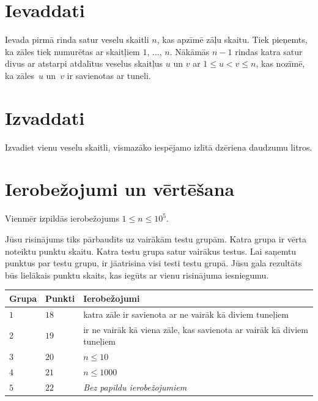 \section*{Ievaddati}

Ievada pirmā rinda satur veselu skaitli $n$, kas apzīmē zāļu skaitu.
Tiek pieņemts, ka zāles tiek numurētas ar skaitļiem $1$, $\ldots$, $n$.
Nākāmās $n-1$ rindas katra satur divus ar atstarpi atdalītus veselus skaitļus $u$ un $v$ ar 
$1\leq u < v \leq n$, %
kas nozīmē, ka zāles~$u$ un~$v$ ir savienotas ar tuneli.

\section*{Izvaddati}

Izvadiet vienu veselu skaitli, vismazāko iespējamo izlītā dzēriena daudzumu litros.

\section*{Ierobežojumi un vērtēšana}

Vienmēr izpildās ierobežojums
$1\leq n\leq 10^5$. %

Jūsu risinājums tiks pārbaudīts uz vairākām testu grupām. Katra grupa ir vērta noteiktu punktu skaitu.
Katra testu grupa satur vairākus testus.
Lai saņemtu punktus par testu grupu, ir jāatrisina visi testi testu grupā.
Jūsu gala rezultāts būs lielākais punktu skaits, kas iegūts ar vienu risinājuma iesniegumu.

\medskip
\begin{tabular}{lll}
Grupa & Punkti & Ierobežojumi \\\hline
  $1$ & $18$ & katra zāle ir savienota ar ne vairāk kā diviem tuneļiem\\
  $2$ & $19$ & ir ne vairāk kā viena zāle, kas savienota ar vairāk kā diviem tuneļiem\\
  $3$ & $20$ & $n\leq 10$\\
  $4$ & $21$ & $n\leq 1000$\\
  $5$ & $22$ & \emph{Bez papildu ierobežojumiem}
\end{tabular}
